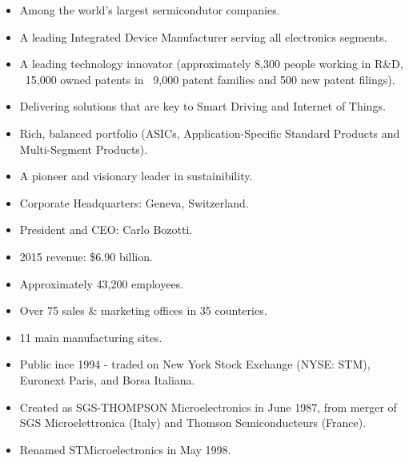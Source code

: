 \begin{itemize}
	\item Among the world's largest sermicondutor companies.
	\item A leading Integrated Device Manufacturer serving all electronics segments.
	\item A leading technology innovator (approximately 8,300 people working in R\&D, ~15,000 owned patents in ~9,000 patent families and 500 new patent filings).
	\item Delivering solutions that are key to Smart Driving and Internet of Things.
	\item Rich, balanced portfolio (ASICs, Application-Specific Standard Products and Multi-Segment Products).
	\item A pioneer and visionary leader in sustainibility.
	\item Corporate Headquarters: Geneva, Switzerland.
	\item President and CEO: Carlo Bozotti.
	\item 2015 revenue: \$6.90 billion.
	\item Approximately 43,200 employees.
	\item Over 75 sales \& marketing offices in 35 counteries.
	\item 11 main manufacturing sites.
	\item Public ince 1994 - traded on New York Stock Exchange (NYSE: STM), Euronext Paris, and Borsa Italiana.
	\item Created as SGS-THOMPSON Microelectronics in June 1987, from merger of SGS Microelettronica (Italy) and Thomson Semiconducteurs (France).
	\item Renamed STMicroelectronics in May 1998.
\end{itemize}
